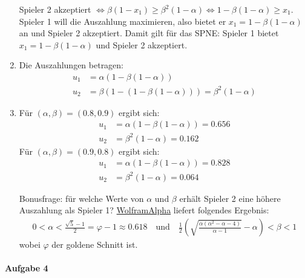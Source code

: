\begin{enumerate}
\begin{center}
    \end{center}
    Spieler 2 akzeptiert $\iff β(1-x_1) \geq β^2(1-α) \iff 1-β(1-α) \geq x_1$.
    Spieler 1 will die Auszahlung maximieren,
    also bietet er $x_1 = 1-β(1-α)$ an und Spieler 2 akzeptiert.
    Damit gilt für das SPNE: Spieler 1 bietet $x_1 = 1-β(1-α)$ und Spieler 2 akzeptiert.

  \item Die Auszahlungen betragen:
    \begin{align*}
      u_1 & = α(1-β(1-α))\\
      u_2 & = β(1-(1-β(1-α))) = β^2 (1-α)
    \end{align*}

  \item Für $(α, β) = (0.8, 0.9)$ ergibt sich:
    \begin{align*}
      u_1 & = α(1-β(1-α)) = 0.656\\
      u_2 & = β^2 (1-α) = 0.162
    \end{align*}
  Für $(α, β) = (0.9, 0.8)$ ergibt sich:
    \begin{align*}
      u_1 & = α(1-β(1-α)) = 0.828\\
      u_2 & = β^2 (1-α) = 0.064
    \end{align*}

  Bonusfrage: für welche Werte von $α$ und $β$ erhält Spieler 2 eine höhere Auszahlung als
  Spieler 1?
  \href{https://www.wolframalpha.com/input/?i=a%281-b%281-a%29%29+%3C+b%5E2%281-a%29+and+0%3Ca%3C1+and+0%3Cb%3C1}{WolframAlpha}
  liefert folgendes Ergebnis:
  \begin{align*}
    0 < α < \frac{\sqrt{5} - 1}{2} = φ - 1 \approx 0.618
    \quad
    \text{und}
    \quad
    \frac{1}{2} \left( \sqrt{\frac{α \left( α^2-α-4 \right)}{α-1}} - α \right) < β < 1
  \end{align*}
  wobei $φ$ der goldene Schnitt ist.
\end{enumerate}

\paragraph{Aufgabe 4}%
\label{par:serie_8_aufgabe_4}

